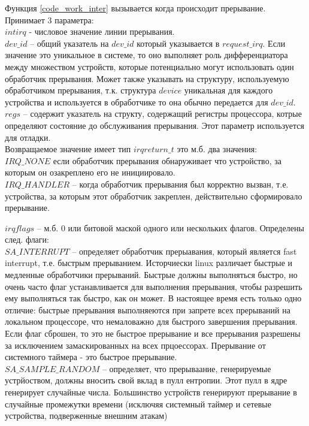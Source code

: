 Функция \ref{code_work_inter} вызывается когда происходит прерывание. Принимает 3 параметра:\\
$int irq$ - числовое значение линии прерывания.\\
$dev\_id$ – общий указатель на $dev\_id$ который указывается в $request\_irq$.  Если значение это уникальное в системе, то оно выполняет роль дифференциатора между множеством устройств, которые потенциально могут использовать один обработчик прерывания. Может также указывать на структуру, используемую обработчиком прерывания, т.к. структура $device$ уникальная для каждого устройства и используется в обработчике то она обычно передается для $dev\_id$.\\
$regs$ – содержит указатель на структу, содержащий регистры процессора, котрые определяют состояние до обслуживания прерывания. Этот параметр используется для отладки.\\

Возвращаемое значение имеет тип  $irqreturn\_t$ это м.б. два значения:\\
$IRQ\_NONE$ если обработчик прерывания обнаруживает что устройство, за которым он озакреплено его не инициировало. \\
$IRQ\_HANDLER$ – когда обработчик прерывания был корректно вызван, т.е. устройства, за которым этот обработчик закреплен, действительно сформировало прерывание. 

$irqflags$ – м.б. 0 или битовой маской одного или нескольких флагов. Определены след. флаги:\\
$SA\_INTERRUPT$ – определяет обработчик прерыавания, который является fast interrupt, т.е. быстрым прерыванием. Исторчиески linux различает быстрые и медленные обработчики прерываний. Быстрые должны выполняться быстро, но очень часто флаг устанавливается для выполнения прерывания, чтобы разрешить ему выполняться так быстро, как он может. В настоящее время есть только одно отличие: быстрые прерывания выполняеются при запрете всех прерываний на локальном процессоре, что немаловажно для быстрого завершения прерывания. Если флаг сброшен, то это не быстрое прерывание и все прерывания разрешены за исключением замаскированных на всех прцоессорах. Прерывание от системного таймера - это быстрое прерывание.\\
$SA\_SAMPLE\_RANDOM$ – определяет, что прерываание, генерируемые устрйоством, должны вносить свой вклад в пулл ентропии. Этот пулл в ядре генерирует случайные числа. Большинство устройств генерируют прерывание в случайные промежутки времени (исключяя системный таймер и сетевые устройства, подверженные внешним атакам)  